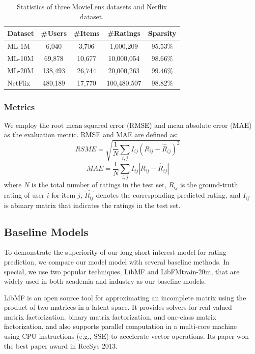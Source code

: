 \documentclass{sig-alternate-05-2015}
\begin{document}
\begin{table}[htpb]
    \centering
    \caption{Statistics of three MovieLens datasets and Netflix dataset.}
    \label{tab:statistics}
    \begin{tabular}{|l|c|c|c|c|}
        \hline
        \textbf{Dataset} & \textbf{\#Users} & \textbf{\#Items} & \textbf{\#Ratings} & \textbf{Sparsity} \\
        \hline
        ML-1M  & 6,040    & 3,706  & 1,000,209   & 95.53\% \\
        ML-10M & 69,878   & 10,677 & 10,000,054  & 98.66\% \\
        ML-20M & 138,493  & 26,744 & 20,000,263  & 99.46\% \\
        NetFlix & 480,189 & 17,770 & 100,480,507 & 98.82\% \\
        \hline
    \end{tabular}
\end{table}

\subsubsection{Metrics}
We employ the root mean squared error (RMSE) and mean absolute error (MAE) as the evaluation metric.
RMSE and MAE are defined as:
\begin{equation}
    RSME = \sqrt{ \frac{1}{N} \sum_{i,j} I_{ij} (R_{ij} - \hat{R}_{ij})^2 }
\end{equation}
\begin{equation}
    MAE = \frac{1}{N} \sum_{i,j} I_{ij} |R_{ij} - \hat{R}_{ij}|
\end{equation}
where $N$ is the total number of ratings in the test set,
$R_{ij}$ is the ground-truth rating of user $i$ for item $j$,
$\hat{R_{ij}}$ denotes the corresponding predicted rating,
and $I_{ij}$ is abinary matrix that indicates the ratings in the test set.

\subsection{Baseline Models}
To demonstrate the superiority of our long-short interest model for rating prediction,
we compare our model model with several baseline methods.
In special, we use two popular techniques, LibMF and LibFMtrain-20m, that are
widely used in both academia and industry as our baseline models.

LibMF is an open source tool for approximating an incomplete matrix
using the product of two matrices in a latent space.
It provides solvers for real-valued matrix factorization,
binary matrix factorization, and one-class matrix factorization, and 
also supports parallel computation in a multi-core machine using CPU instructions
(e.g., SSE) to accelerate vector operations.
Its paper \cite{chin2015fast} won the best paper award in RecSys 2013.
\end{document}
